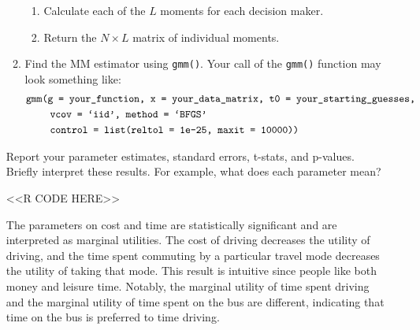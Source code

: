 \documentclass[11pt,letterpaper]{article}
\begin{document}
\begin{enumerate}[label=\alph*., leftmargin=*]
\begin{enumerate}[label=\Roman*.]
\begin{enumerate}[label=\roman*.]
			\item Calculate each of the $L$ moments for each decision maker.
			\item Return the $N \times L$ matrix of individual moments.
		\end{enumerate}
		\item Find the MM estimator using \texttt{gmm()}. Your call of the \texttt{gmm()} function may look something like:
		\begin{align*}
			&\text{\texttt{gmm(g = your\_function, x = your\_data\_matrix, t0 = your\_starting\_guesses, }} \\
			&\qquad~ \text{\texttt{vcov = `iid', method = `BFGS'}} \\
			&\qquad~ \text{\texttt{control = list(reltol = 1e-25, maxit = 10000))}}
		\end{align*}
	\end{enumerate}
	Report your parameter estimates, standard errors, t-stats, and p-values. Briefly interpret these results. For example, what does each parameter mean?

	<<R CODE HERE>>

	The parameters on cost and time are statistically significant and are interpreted as marginal utilities. The cost of driving decreases the utility of driving, and the time spent commuting by a particular travel mode decreases the utility of taking that mode. This result is intuitive since people like both money and leisure time. Notably, the marginal utility of time spent driving and the marginal utility of time spent on the bus are different, indicating that time on the bus is preferred to time driving.


\end{enumerate}
\end{document}
